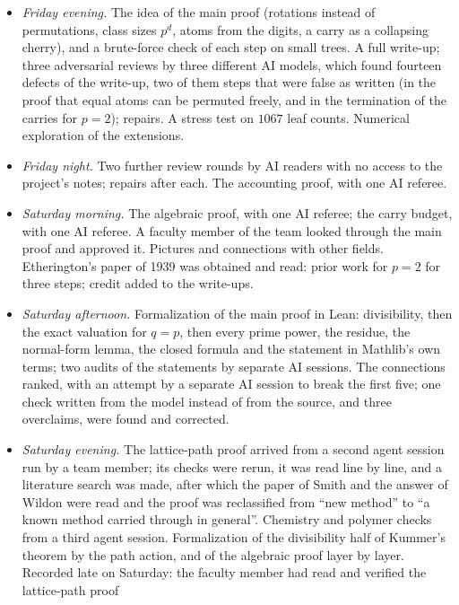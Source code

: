 \documentclass[11pt]{article}
\theoremstyle{definition}
\theoremstyle{remark}
\numberwithin{equation}{section}
\numberwithin{figure}{section}
\begin{document}
\begin{itemize}[itemsep=1pt]
\item \emph{Friday evening.} The idea of the main proof (rotations instead of permutations, class sizes $p^d$,
 atoms from the digits, a carry as a collapsing cherry), and a brute-force check of each step on small trees.
 A full write-up; three adversarial reviews by three different AI models, which found fourteen defects of the
 write-up, two of them steps that were false as written (in the proof that equal atoms can be permuted
 freely, and in the termination of the carries for $p=2$); repairs. A stress test on $1067$ leaf counts.
 Numerical exploration of the extensions.
\item \emph{Friday night.} Two further review rounds by AI readers with no access to the project's notes;
 repairs after each. The accounting proof, with one AI referee.
\item \emph{Saturday morning.} The algebraic proof, with one AI referee; the carry budget, with one AI
 referee. A faculty member of the team looked through the main proof and approved it. Pictures and
 connections with other fields. Etherington's paper of 1939 was obtained and read: prior work for $p=2$ for
 three steps; credit added to the write-ups.
\item \emph{Saturday afternoon.} Formalization of the main proof in Lean: divisibility, then the exact
 valuation for $q=p$, then every prime power, the residue, the normal-form lemma, the closed formula and the
 statement in Mathlib's own terms; two audits of the statements by separate AI sessions. The connections
 ranked, with an attempt by a separate AI session to break the first five; one check written from the model
 instead of from the source, and three overclaims, were found and corrected.
\item \emph{Saturday evening.} The lattice-path proof arrived from a second agent session run by a team
 member; its checks were rerun, it was read line by line, and a literature search was made, after which the
 paper of Smith and the answer of Wildon were read and the proof was reclassified from ``new method'' to ``a
 known method carried through in general''. Chemistry and polymer checks from a third agent session.
 Formalization of the divisibility half of Kummer's theorem by the path action, and of the algebraic proof
 layer by layer. Recorded late on Saturday: the faculty member had read and verified the lattice-path proof

\end{itemize}
\end{document}
